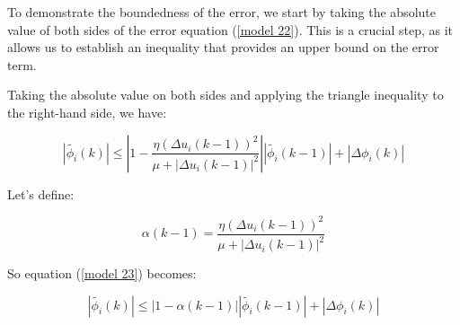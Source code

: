 \documentclass[journal,onecolumn]{IEEEtran}
\begin{document}





To demonstrate the boundedness of the error, we start by taking the absolute value of both sides of the error equation (\ref{model 22}). This is a crucial step, as it allows us to establish an inequality that provides an upper bound on the error term.

Taking the absolute value on both sides and applying the triangle inequality to the right-hand side, we have:

\begin{equation}
\label{model 23}
|\tilde{\phi_i}(k)| \leq \left| 1 - \frac{\eta (\Delta u_i(k-1))^2}{\mu + |\Delta u_i(k-1)|^2} \right| |\tilde{\phi_i}(k-1)| + |\Delta \phi_i(k)|
\end{equation}

Let’s define:

\begin{equation}
\label{model 24}
\alpha(k-1) = \frac{\eta (\Delta u_i(k-1))^2}{\mu + |\Delta u_i(k-1)|^2}
\end{equation}

So equation (\ref{model 23}) becomes:

\begin{equation}
\label{model 25}
|\tilde{\phi_i}(k)| \leq |1 - \alpha(k-1)| |\tilde{\phi_i}(k-1)| + |\Delta \phi_i(k)|
\end{equation}
\end{document}
